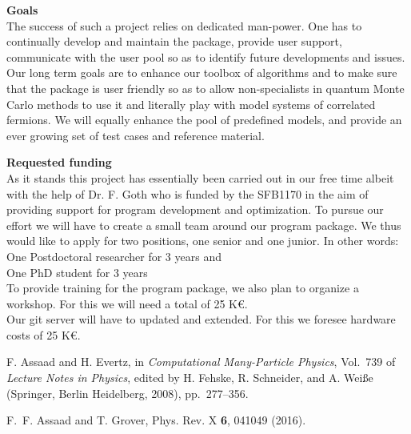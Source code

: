 \documentclass[12pt]{article}
\begin{document}
 
{\bf Goals } \\
The success of such a project relies on dedicated man-power. One has to continually develop and  maintain the package, provide user support, communicate with the user pool so as to identify  future developments and issues.   Our long term  goals  are  to enhance  our toolbox of algorithms  and to  make sure that the package is user friendly so as to allow  non-specialists  in quantum Monte Carlo methods to  use it and literally play with model systems of correlated fermions.  We will equally  enhance the pool of predefined models, and provide an ever growing set of test cases and reference material. 

{\bf Requested funding } \\
As it stands this project has essentially been carried out in our free time albeit with the help of  Dr. F. Goth who is funded by the SFB1170   in the aim of providing support for program development and optimization. To pursue our effort we will have to create a small team around our program package. We thus would like to apply for two positions, one senior and one junior. In other words: \\ 

One Postdoctoral researcher for 3 years  and \\
One PhD student for 3 years \\

To provide training for the program package, we also plan to organize a workshop. For this we  will need a total of 25 K\euro.  \\

Our git server will have to updated  and extended. For this we foresee hardware costs of  25 K\euro. \\


% 
% 
%
\small 
\begin{thebibliography}{1}

F. Assaad and H. Evertz,  in {\em Computational Many-Particle Physics},
  Vol.~739 of {\em Lecture Notes in Physics}, edited by H. Fehske, R.
  Schneider, and A. Wei{\ss}e (Springer, Berlin Heidelberg, 2008), pp.\
  277--356.

F.~F. Assaad and T. Grover, Phys. Rev. X {\bf 6},  041049  (2016).

\end{thebibliography}
\normalsize
\end{document}
